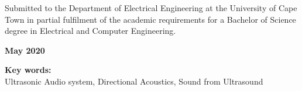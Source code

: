 \begin{titlepage}
\vskip 10mm
\begin{center}
Submitted to the Department of Electrical Engineering at the University of Cape Town in partial
fulfilment of the academic requirements for a Bachelor of Science degree in Electrical and Computer Engineering.
\end{center}


\vskip 5mm
\begin{center}{\bf May 2020}
\end{center}

\begin{center}
\textbf{Key words:}\\
Ultrasonic Audio system, Directional Acoustics, Sound from Ultrasound
\end{center}

\end{titlepage}